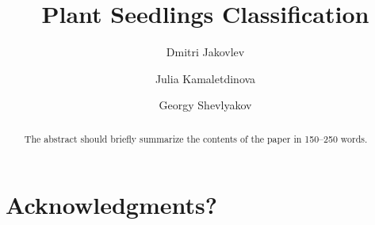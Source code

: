 \documentclass[runningheads]{llncs}
\begin{document}
%
\title{Plant Seedlings Classification}
%
\author{Dmitri Jakovlev \and Julia Kamaletdinova \and Georgy Shevlyakov}
%
%

%
\maketitle              %
%
\begin{abstract}
The abstract should briefly summarize the contents of the paper in
150--250 words.

\end{abstract}
%
%
%











\section{Acknowledgments?}
%
%


\end{document}
